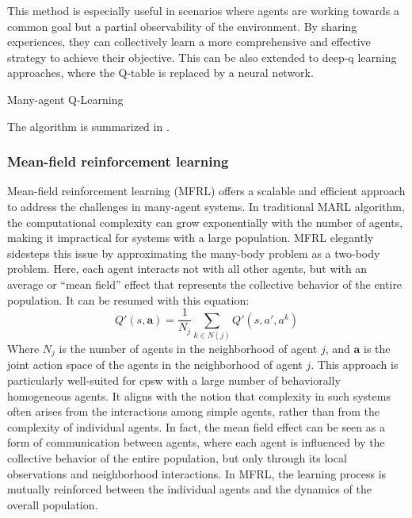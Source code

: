 This method is especially useful in scenarios where agents are working towards a common goal but a partial observability of the environment. 
 By sharing experiences, 
 they can collectively learn a more comprehensive and effective strategy to achieve their objective.
%
This can be also extended to deep-q learning approaches, 
 where the Q-table is replaced by a neural network.
%
\begin{algorithm}
\caption{Many-agent Q-Learning}
\label{alg:maql}
\DontPrintSemicolon
{}
\end{algorithm}
The algorithm is summarized in .
\subsubsection*{Mean-field reinforcement learning}
Mean-field reinforcement learning (MFRL) offers a scalable and efficient approach to address the challenges in many-agent systems. 
 In traditional MARL algorithm, 
 the computational complexity can grow exponentially with the number of agents, 
 making it impractical for systems with a large population. MFRL elegantly sidesteps this issue by approximating the many-body problem as a two-body problem. 
 Here, each agent interacts not with all other agents, 
 but with an average or ``mean field'' effect that represents the collective behavior of the entire population.
 It can be resumed with this equation:
 $$
 Q'(s, \bm{a}) = \frac{1}{N_j} \sum_{k \in N(j)} Q'(s, a', a^k)
 $$
Where $N_j$ is the number of agents in the neighborhood of agent $j$, and $\bm{a}$ is the joint action space of the agents in the neighborhood of agent $j$.
%
This approach is particularly well-suited for \ac{cpsw} with a large number of behaviorally homogeneous agents. 
 It aligns with the notion that complexity in such systems often arises from the interactions among simple agents,
 rather than from the complexity of individual agents.
 In fact, the mean field effect can be seen as a form of communication between agents, 
 where each agent is influenced by the collective behavior of the entire population, but only through its local observations and neighborhood interactions. 
 In MFRL, the learning process is mutually reinforced between the individual agents and the dynamics of the overall population. 
%
